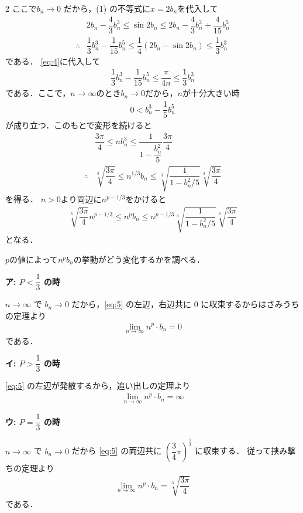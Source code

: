 \documentclass[../../main.tex]{subfiles}
\begin{document}
\begin{multicols}{2}
  ここで$b_n \to 0$ だから，(1) の不等式に$x=2b_n$を代入して
  \begin{align}
    & 2b_n - \dfrac{4}{3}b^3_n \leq \sin 2b_n \leq 2b_n - \dfrac{4}{3}b^3_n + \dfrac{4}{15}b^5_n                   \\
    \therefore
    & \dfrac{1}{3}b^3_n - \dfrac{1}{15}b^5_n  \leq \dfrac{1}{4}\left(2b_n - \sin 2b_n\right) \leq \dfrac{1}{3}b^3_n
  \end{align}
  である．
  \cref{eq:4}に代入して
  \begin{align}
    \dfrac{1}{3}b^3_n - \dfrac{1}{15}b^5_n \leq \dfrac{\pi}{4n}  \leq \dfrac{1}{3}b^3_n
  \end{align}
  である．ここで，$n\to\infty$のとき$b_n\to 0$だから，$n$が十分大きい時
  \begin{align}
    0 < b^3_n - \dfrac{1}{5}b^5_n
  \end{align}
  が成り立つ．このもとで変形を続けると
  \begin{align}
    & \dfrac{3\pi}{4}  \leq nb^3_n \leq \dfrac{1}{ 1 - \dfrac{b^2_n}{5}}\dfrac{3\pi}{4}                         \\
    \therefore
    & \sqrt[3]{\dfrac{3\pi}{4}} \leq n^{1/3}b_n \leq \sqrt[3]{\dfrac{1}{1 - b^2_n/5}}\sqrt[3]{\dfrac{3\pi}{4}}
  \end{align}
  を得る．
  $n>0$より両辺に$n^{p-1/3}$をかけると
  \begin{align}
    \sqrt[3]{\dfrac{3\pi}{4}}n^{p-1/3} \leq n^{p}b_n \leq n^{p-1/3} \sqrt[3]{\dfrac{1}{1 - b^2_n/5}}\sqrt[3]{\dfrac{3\pi}{4}} \label{eq:5}
  \end{align}
  となる．

  $p$の値によって$n^{p}b_n$の挙動がどう変化するかを調べる．

  \textbf{ア: $P < \dfrac{1}{3}$ の時}

  $n \to \infty$ で $b_n \to 0$ だから，\cref{eq:5} の左辺，右辺共に $0$ に収束するからはさみうちの定理より
  \begin{align}
    \lim_{n\to\infty} n^p \cdot b_n = 0
  \end{align}
  である．

  \textbf{イ: $P > \dfrac{1}{3}$ の時}

  \cref{eq:5} の左辺が発散するから，追い出しの定理より
  \begin{align}
    \lim_{n\to\infty} n^p \cdot b_n = \infty
  \end{align}

  \textbf{ウ: $P = \dfrac{1}{3}$ の時}

  $n \to \infty$ で $b_n \to 0$ だから \cref{eq:5} の両辺共に $\left(\dfrac{3}{4}\pi\right)^{\frac{1}{3}}$ に収束する．
  従って挟み撃ちの定理より
  \begin{align}
    \lim_{n\to\infty} n^p \cdot b_n = \sqrt[3]{\dfrac{3\pi}{4}}
  \end{align}
  である．


\end{multicols}
\end{document}

